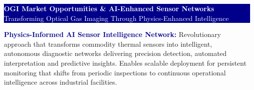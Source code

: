 \documentclass[11pt,a4paper]{article}
\begin{document}
\begin{center}
\colorbox{darkblue}{\parbox{\textwidth}{\centering
\textcolor{white}{\huge\textbf{OGI Market Opportunities \& AI-Enhanced Sensor Networks}}\\
\textcolor{white}{\large Transforming Optical Gas Imaging Through Physics-Enhanced Intelligence}
}}
\end{center}

\vspace{0.3cm}

\begin{minipage}{0.1\textwidth}
\end{minipage}
\begin{minipage}{0.85\textwidth}
\textcolor{darkblue}{\textbf{Physics-Informed AI Sensor Intelligence Network:}} Revolutionary approach that transforms commodity thermal sensors into intelligent, autonomous diagnostic networks delivering precision detection, automated interpretation and predictive insights. Enables scalable deployment for persistent monitoring that shifts from periodic inspections to continuous operational intelligence across industrial facilities.
\end{minipage}

\vspace{0.4cm}
\end{document}

